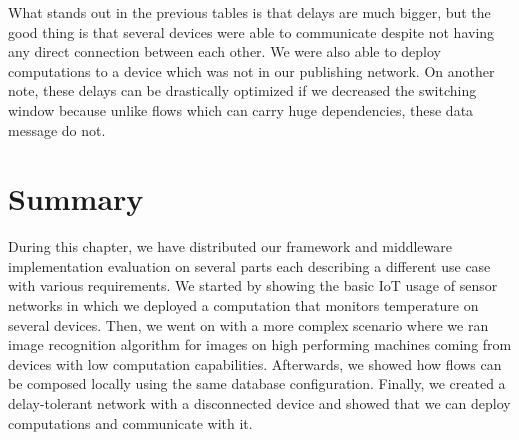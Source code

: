 \noindent What stands out in the previous tables is that delays are much bigger, but the good thing is that several devices were able to communicate despite not having any direct connection between each other. We were also able to deploy computations to a device which was not in our publishing network. On another note, these delays can be drastically optimized if we decreased the switching window because unlike flows which can carry huge dependencies, these data message do not.

\section{Summary}

During this chapter, we have distributed our framework and middleware implementation evaluation on several parts each describing a different use case with various requirements. We started by showing the basic IoT usage of sensor networks in which we deployed a computation that monitors temperature on several devices.  Then, we went on with a more complex scenario where we ran image recognition algorithm for images on high performing machines coming from devices with low computation capabilities. Afterwards, we showed how flows can be composed locally using the same database configuration. Finally, we created a delay-tolerant network with a disconnected device and showed that we can deploy computations and communicate with it.
